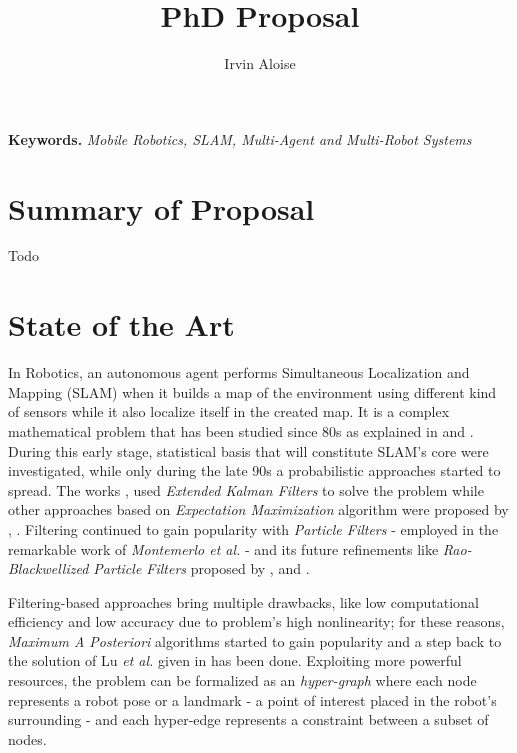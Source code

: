 \documentclass[10pt,a4paper, notitlepage]{report}
\title{PhD Proposal}
\author{Irvin Aloise}
\begin{document}
\maketitle


\textbf{Keywords.} \textit{Mobile Robotics, SLAM, Multi-Agent and Multi-Robot Systems}

\newpage

\section*{Summary of Proposal}
Todo


\section*{State of the Art}
In Robotics, an autonomous agent performs Simultaneous Localization and Mapping (SLAM) when it builds a map of the environment using different kind of sensors while it also localize itself in the created map. It is a complex mathematical problem that has been studied since 80s as explained in \cite{durrant2006simultaneous} and \cite{bailey2006simultaneous}. During this early stage, statistical basis that will constitute SLAM's core were investigated, while only during the late 90s a probabilistic approaches started to spread. The works \cite{leonard1990dynamic}, \cite{dissanayake2001solution} used \textit{Extended Kalman Filters} to solve the problem while other approaches based on \textit{Expectation Maximization} algorithm were proposed by \cite{dellaert2003mcmc}, \cite{thrun2001probabilistic}. Filtering continued to gain popularity with \textit{Particle Filters} - employed in the remarkable work of \textit{Montemerlo et al.} \cite{montemerlo2002fastslam} - and its future refinements like \textit{Rao-Blackwellized Particle Filters} proposed by \cite{grisetti2005improving}, \cite{carlone2010rao} and \cite{tipaldi2007heterogeneous}.

Filtering-based approaches bring multiple drawbacks, like low computational efficiency and low accuracy due to problem's high nonlinearity; for these reasons, \textit{Maximum A Posteriori} algorithms started to gain popularity and a step back to the solution of Lu \textit{et al.} given in \cite{lu1997globally} has been done. Exploiting more powerful resources, the problem can be formalized as an \textit{hyper-graph} where each node represents a robot pose or a landmark - a point of interest placed in the robot's surrounding - and each hyper-edge represents a constraint between a subset of nodes. 
\end{document}
